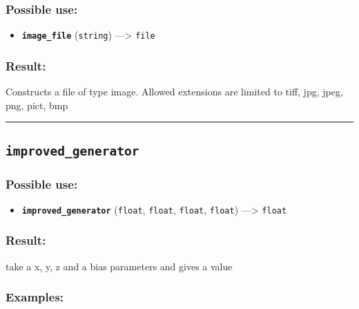 \documentclass[]{book}
\providecommand{\tightlist}{%
  \setlength{\itemsep}{0pt}\setlength{\parskip}{0pt}}
\theoremstyle{definition}
\theoremstyle{definition}
\theoremstyle{definition}
\theoremstyle{remark}
\begin{document}
\subsubsection{Possible use:}\label{possible-use-264}

\begin{itemize}
\tightlist
\item
  \textbf{\texttt{image\_file}} (\texttt{string}) ---\textgreater{}
  \texttt{file}
\end{itemize}

\subsubsection{Result:}\label{result-254}

Constructs a file of type image. Allowed extensions are limited to tiff,
jpg, jpeg, png, pict, bmp

\begin{center}\rule{0.5\linewidth}{\linethickness}\end{center}

\subsection{\texorpdfstring{\texttt{improved\_generator}}{improved\_generator}}\label{improved_generator}

\subsubsection{Possible use:}\label{possible-use-265}

\begin{itemize}
\tightlist
\item
  \textbf{\texttt{improved\_generator}} (\texttt{float}, \texttt{float},
  \texttt{float}, \texttt{float}) ---\textgreater{} \texttt{float}
\end{itemize}

\subsubsection{Result:}\label{result-255}

take a x, y, z and a bias parameters and gives a value

\subsubsection{Examples:}\label{examples-203}
\end{document}
